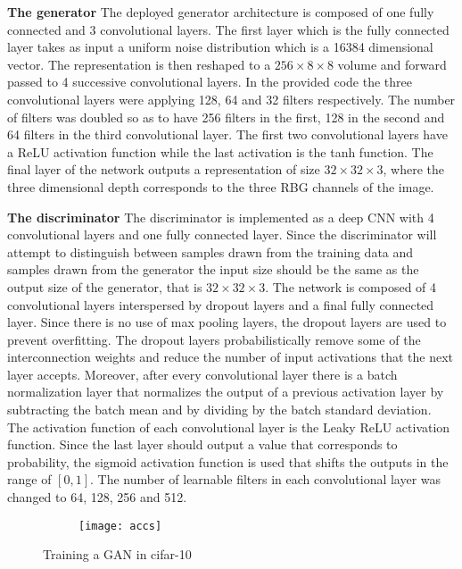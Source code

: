 \documentclass[conference,compsoc]{IEEEtran}
\begin{document}
\textbf{The generator}
The deployed generator architecture is composed of one fully connected and 3 convolutional layers. The first layer which is the fully connected layer takes as input a uniform noise distribution which is a 16384 dimensional vector. The representation is then reshaped to a $256 \times 8 \times 8$ volume and forward passed to 4 successive convolutional layers. In the provided code the three convolutional layers were applying 128, 64 and 32 filters respectively. The number of filters was doubled so as to have 256 filters in the first, 128 in the second and 64 filters in the third convolutional layer. The first two convolutional layers have a ReLU activation function while the last activation is the tanh function. The final layer of the network outputs a representation of size $32 \times 32 \times 3$, where the three dimensional depth corresponds to the three RBG channels of the image. 

\textbf{The discriminator} The discriminator is implemented as a deep CNN with 4 convolutional layers and one fully connected layer. Since the discriminator will attempt to distinguish between samples drawn from the training data and samples drawn from the generator the input size should be the same as the output size of the generator, that is $32 \times 32 \times 3$. The network is composed of 4 convolutional layers interspersed by dropout layers and a final fully connected layer. Since there is no use of max pooling layers, the dropout layers are used to prevent overfitting. The dropout layers probabilistically remove some of the interconnection weights and reduce the number of input activations that the next layer accepts. Moreover, after every convolutional layer there is a batch normalization layer that normalizes the output of a previous activation layer by subtracting the batch mean and by dividing by the batch standard deviation. The activation function of each convolutional layer is the Leaky ReLU activation function. Since the last layer should output a value that corresponds to probability, the sigmoid activation function is used that shifts the outputs in the range of $[0,1]$. The number of learnable filters in each convolutional layer was changed to 64, 128, 256 and 512.

    \begin{figure}[]
        \centering
     \begin{subfigure}{8cm}
          \texttt{[image: accs]}
     \end{subfigure}

  	        
        \caption{Training a GAN in cifar-10}
        \label{accs}
\end{figure}
\end{document}
